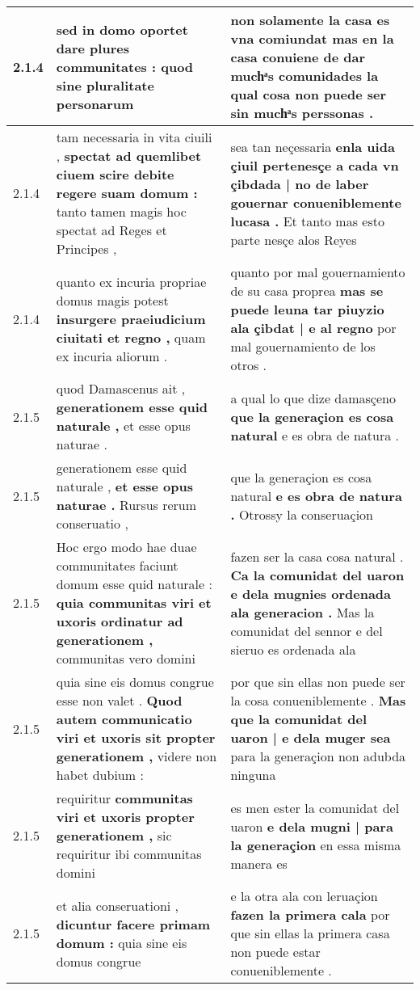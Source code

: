 \begin{tabular}{|p{1cm}|p{6.5cm}|p{6.5cm}|}
2.1.4 & sed in domo oportet \textbf{ dare plures communitates : } quod sine pluralitate personarum & non solamente la casa es vna comiundat \textbf{ mas en la casa conuiene de dar muchͣs comunidades } la qual cosa non puede ser sin muchͣs perssonas . \\\hline
2.1.4 & tam necessaria in vita ciuili , \textbf{ spectat ad quemlibet ciuem scire debite regere suam domum : } tanto tamen magis hoc spectat ad Reges et Principes , & sea tan neçessaria \textbf{ enla uida çiuil pertenesçe a cada vn çibdada | no de laber gouernar conueniblemente lucasa . } Et tanto mas esto parte nesçe alos Reyes \\\hline
2.1.4 & quanto ex incuria propriae domus magis potest \textbf{ insurgere praeiudicium ciuitati et regno , } quam ex incuria aliorum . & quanto por mal gouernamiento de su casa proprea \textbf{ mas se puede leuna tar piuyzio ala çibdat | e al regno } por mal gouernamiento de los otros . \\\hline
2.1.5 & quod Damascenus ait , \textbf{ generationem esse quid naturale , } et esse opus naturae . & a qual lo que dize damasçeno \textbf{ que la generaçion es cosa natural } e es obra de natura . \\\hline
2.1.5 & generationem esse quid naturale , \textbf{ et esse opus naturae . } Rursus rerum conseruatio , & que la generaçion es cosa natural \textbf{ e es obra de natura . } Otrossy la conseruaçion \\\hline
2.1.5 & Hoc ergo modo hae duae communitates faciunt domum esse quid naturale : \textbf{ quia communitas viri et uxoris ordinatur ad generationem , } communitas vero domini & fazen ser la casa cosa natural . \textbf{ Ca la comunidat del uaron e dela mugnies ordenada ala generacion . } Mas la comunidat del sennor e del sieruo es ordenada ala \\\hline
2.1.5 & quia sine eis domus congrue esse non valet . \textbf{ Quod autem communicatio viri et uxoris sit propter generationem , } videre non habet dubium : & por que sin ellas non puede ser la cosa conueniblemente . \textbf{ Mas que la comunidat del uaron | e dela muger sea } para la generaçion non adubda ninguna \\\hline
2.1.5 & requiritur \textbf{ communitas viri et uxoris propter generationem , } sic requiritur ibi communitas domini & es men ester la comunidat del uaron \textbf{ e dela mugni | para la generaçion } en essa misma manera es \\\hline
2.1.5 & et alia conseruationi , \textbf{ dicuntur facere primam domum : } quia sine eis domus congrue & e la otra ala con leruaçion \textbf{ fazen la primera cala } por que sin ellas la primera casa non puede estar conueniblemente . \\\hline

\end{tabular}
